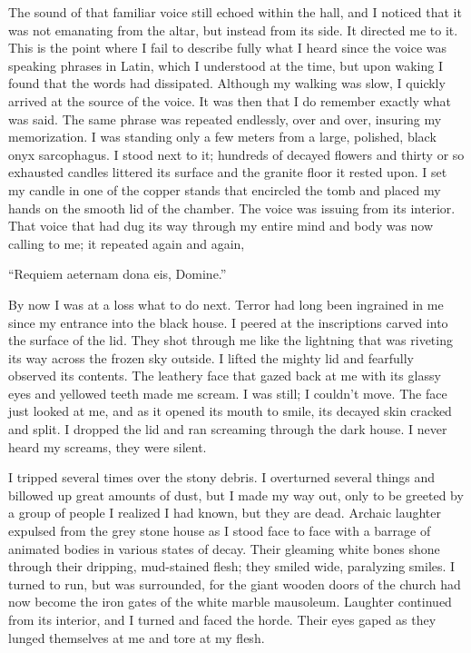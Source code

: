 The sound of that familiar voice still echoed within the hall, and I
noticed that it was not emanating from the altar, but instead from its
side. It directed me to it. This is the point where I fail to describe
fully what I heard since the voice was speaking phrases in Latin, which
I understood at the time, but upon waking I found that the words had
dissipated. Although my walking was slow, I quickly arrived at the
source of the voice. It was then that I do remember exactly what was
said. The same phrase was repeated endlessly, over and over, insuring my
memorization. I was standing only a few meters from a large, polished,
black onyx sarcophagus. I stood next to it; hundreds of decayed flowers
and thirty or so exhausted candles littered its surface and the granite
floor it rested upon. I set my candle in one of the copper stands that
encircled the tomb and placed my hands on the smooth lid of the chamber.
The voice was issuing from its interior. That voice that had dug its way
through my entire mind and body was now calling to me; it repeated again
and again,

``Requiem aeternam dona eis, Domine.''

By now I was at a loss what to do next. Terror had long been ingrained
in me since my entrance into the black house. I peered at the
inscriptions carved into the surface of the lid. They shot through me
like the lightning that was riveting its way across the frozen sky
outside. I lifted the mighty lid and fearfully observed its contents.
The leathery face that gazed back at me with its glassy eyes and
yellowed teeth made me scream. I was still; I couldn't move. The face
just looked at me, and as it opened its mouth to smile, its decayed skin
cracked and split. I dropped the lid and ran screaming through the dark
house. I never heard my screams, they were silent.

I tripped several times over the stony debris. I overturned several
things and billowed up great amounts of dust, but I made my way out,
only to be greeted by a group of people I realized I had known, but they
are dead. Archaic laughter expulsed from the grey stone house as I stood
face to face with a barrage of animated bodies in various states of
decay. Their gleaming white bones shone through their dripping,
mud-stained flesh; they smiled wide, paralyzing smiles. I turned to run,
but was surrounded, for the giant wooden doors of the church had now
become the iron gates of the white marble mausoleum. Laughter continued
from its interior, and I turned and faced the horde. Their eyes gaped as
they lunged themselves at me and tore at my flesh.

